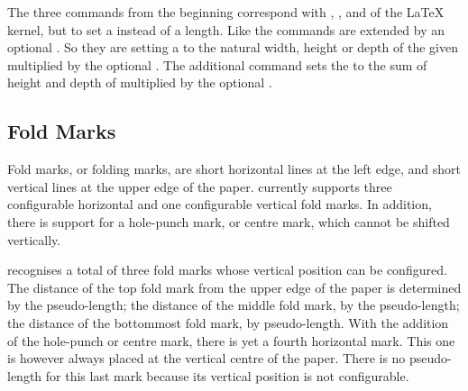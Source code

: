 \begin{Declaration}
\end{Declaration}
The three commands
from the beginning correspond with ,
, and  of the \LaTeX{} kernel, but to set
a  instead of a length. Like 
 the commands are extended by an optional
. So they are setting a  to the natural
width, height or depth of the given  multiplied by the optional
. The additional command 
 sets the  to the sum of
height and depth of  multiplied by the optional
.%
\EndIndexGroup


\subsection{Fold Marks}
\BeginIndexGroup
{}%

Fold marks, or folding marks, are short horizontal lines at the left edge, and
short vertical lines at the upper edge of the paper. \KOMAScript{} currently
supports three configurable horizontal and one configurable vertical fold
marks. In addition, there is support for a hole-punch mark, or centre mark,
which cannot be shifted vertically.

\begin{Declaration}
\end{Declaration}
\KOMAScript{} recognises a total of three fold marks whose vertical position
can be configured. The distance of the top fold mark from the upper edge of
the paper is determined by the  pseudo-length; the
distance of the middle fold mark, by the
 pseudo-length; the
distance of the bottommost fold mark, by 
pseudo-length. With the addition of the hole-punch or
centre mark, there is yet a fourth
horizontal mark. This one is however always placed at the vertical centre of
the paper.
\iftrue%
There is no pseudo-length for this last mark because its vertical position is
not configurable.
\fi

